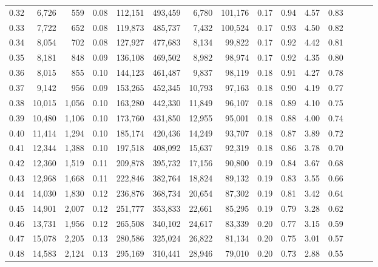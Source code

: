 \begin{tabular}{rrrrrrrrrrrrrrr}
0.32 &   6,726 &    559 &  0.08 &  112,151 &  493,459 &    6,780 &  101,176 &  0.17 &  0.94 &  4.57 &      0.83 \\
0.33 &   7,722 &    652 &  0.08 &  119,873 &  485,737 &    7,432 &  100,524 &  0.17 &  0.93 &  4.50 &      0.82 \\
0.34 &   8,054 &    702 &  0.08 &  127,927 &  477,683 &    8,134 &   99,822 &  0.17 &  0.92 &  4.42 &      0.81 \\
0.35 &   8,181 &    848 &  0.09 &  136,108 &  469,502 &    8,982 &   98,974 &  0.17 &  0.92 &  4.35 &      0.80 \\
0.36 &   8,015 &    855 &  0.10 &  144,123 &  461,487 &    9,837 &   98,119 &  0.18 &  0.91 &  4.27 &      0.78 \\
0.37 &   9,142 &    956 &  0.09 &  153,265 &  452,345 &   10,793 &   97,163 &  0.18 &  0.90 &  4.19 &      0.77 \\
0.38 &  10,015 &  1,056 &  0.10 &  163,280 &  442,330 &   11,849 &   96,107 &  0.18 &  0.89 &  4.10 &      0.75 \\
0.39 &  10,480 &  1,106 &  0.10 &  173,760 &  431,850 &   12,955 &   95,001 &  0.18 &  0.88 &  4.00 &      0.74 \\
0.40 &  11,414 &  1,294 &  0.10 &  185,174 &  420,436 &   14,249 &   93,707 &  0.18 &  0.87 &  3.89 &      0.72 \\
0.41 &  12,344 &  1,388 &  0.10 &  197,518 &  408,092 &   15,637 &   92,319 &  0.18 &  0.86 &  3.78 &      0.70 \\
0.42 &  12,360 &  1,519 &  0.11 &  209,878 &  395,732 &   17,156 &   90,800 &  0.19 &  0.84 &  3.67 &      0.68 \\
0.43 &  12,968 &  1,668 &  0.11 &  222,846 &  382,764 &   18,824 &   89,132 &  0.19 &  0.83 &  3.55 &      0.66 \\
0.44 &  14,030 &  1,830 &  0.12 &  236,876 &  368,734 &   20,654 &   87,302 &  0.19 &  0.81 &  3.42 &      0.64 \\
0.45 &  14,901 &  2,007 &  0.12 &  251,777 &  353,833 &   22,661 &   85,295 &  0.19 &  0.79 &  3.28 &      0.62 \\
0.46 &  13,731 &  1,956 &  0.12 &  265,508 &  340,102 &   24,617 &   83,339 &  0.20 &  0.77 &  3.15 &      0.59 \\
0.47 &  15,078 &  2,205 &  0.13 &  280,586 &  325,024 &   26,822 &   81,134 &  0.20 &  0.75 &  3.01 &      0.57 \\
0.48 &  14,583 &  2,124 &  0.13 &  295,169 &  310,441 &   28,946 &   79,010 &  0.20 &  0.73 &  2.88 &      0.55 \\

\end{tabular}
